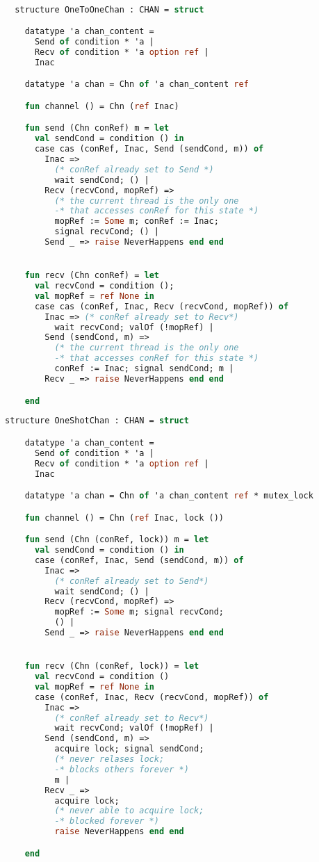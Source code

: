 \documentclass{article}
\begin{document}
  \begin{lstlisting}[language=ML, style=codestyle1]

  structure OneToOneChan : CHAN = struct

    datatype 'a chan_content =
      Send of condition * 'a |
      Recv of condition * 'a option ref |
      Inac  

    datatype 'a chan = Chn of 'a chan_content ref

    fun channel () = Chn (ref Inac)

    fun send (Chn conRef) m = let
      val sendCond = condition () in
      case cas (conRef, Inac, Send (sendCond, m)) of
        Inac => 
          (* conRef already set to Send *)
          wait sendCond; () |
        Recv (recvCond, mopRef) =>
          (* the current thread is the only one
          -* that accesses conRef for this state *)
          mopRef := Some m; conRef := Inac;
          signal recvCond; () |
        Send _ => raise NeverHappens end end


    fun recv (Chn conRef) = let
      val recvCond = condition ();
      val mopRef = ref None in
      case cas (conRef, Inac, Recv (recvCond, mopRef)) of
        Inac => (* conRef already set to Recv*)
          wait recvCond; valOf (!mopRef) |
        Send (sendCond, m) =>
          (* the current thread is the only one
          -* that accesses conRef for this state *)
          conRef := Inac; signal sendCond; m |
        Recv _ => raise NeverHappens end end 

    end
  \end{lstlisting}

  \begin{lstlisting}[language=ML, style=codestyle1]
    structure OneShotChan : CHAN = struct

    datatype 'a chan_content =
      Send of condition * 'a |
      Recv of condition * 'a option ref |
      Inac  

    datatype 'a chan = Chn of 'a chan_content ref * mutex_lock

    fun channel () = Chn (ref Inac, lock ())

    fun send (Chn (conRef, lock)) m = let
      val sendCond = condition () in
      case (conRef, Inac, Send (sendCond, m)) of
        Inac =>
          (* conRef already set to Send*)
          wait sendCond; () |
        Recv (recvCond, mopRef) =>
          mopRef := Some m; signal recvCond;
          () |
        Send _ => raise NeverHappens end end


    fun recv (Chn (conRef, lock)) = let
      val recvCond = condition ()
      val mopRef = ref None in
      case (conRef, Inac, Recv (recvCond, mopRef)) of
        Inac =>
          (* conRef already set to Recv*)
          wait recvCond; valOf (!mopRef) |
        Send (sendCond, m) =>
          acquire lock; signal sendCond;
          (* never relases lock;
          -* blocks others forever *)
          m |
        Recv _ =>
          acquire lock;
          (* never able to acquire lock;
          -* blocked forever *)
          raise NeverHappens end end

    end
  \end{lstlisting}
\end{document}
